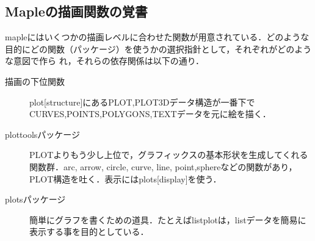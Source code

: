 \subsection{Mapleの描画関数の覚書}
mapleにはいくつかの描画レベルに合わせた関数が用意されている．どのような目的にどの関数（パッケージ）を使うかの選択指針として，それぞれがどのような意図で作ら
れ，それらの依存関係は以下の通り．
\begin{description}
\item[描画の下位関数]
plot[structure]にあるPLOT,PLOT3Dデータ構造が一番下でCURVES,POINTS,POLYGONS,TEXTデータを元に絵を描く．
\item[plottoolsパッケージ]
PLOTよりもう少し上位で，グラフィックスの基本形状を生成してくれる関数群．arc, arrow, circle, curve, line, point,sphereなどの関数があり，PLOT構造を吐く．表示にはplots[display]を使う．
\item[plotsパッケージ]
簡単にグラフを書くための道具．たとえばlistplotは，listデータを簡易に表示する事を目的としている．
\end{description}
